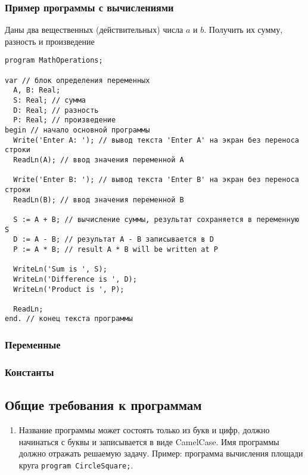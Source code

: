 \subsubsection{Пример программы с вычислениями}
Даны два вещественных (действительных) числа $a$ и $b$. Получить их сумму, разность и произведение
\begin{lstlisting}[label=some-code,caption={Текст программы MathOperations}]
program MathOperations;

var // блок определения переменных
  A, B: Real;
  S: Real; // сумма
  D: Real; // разность
  P: Real; // произведение
begin // начало основной программы
  Write('Enter A: '); // вывод текста 'Enter A' на экран без переноса строки
  ReadLn(A); // ввод значения переменной A

  Write('Enter B: '); // вывод текста 'Enter B' на экран без переноса строки
  ReadLn(B); // ввод значения переменной B

  S := A + B; // вычисление суммы, результат сохраняется в переменную S
  D := A - B; // результат A - B записывается в D
  P := A * B; // result A * B will be written at P

  WriteLn('Sum is ', S);
  WriteLn('Difference is ', D);
  WriteLn('Product is ', P);

  ReadLn;
end. // конец текста программы
\end{lstlisting}

\subsubsection{Переменные}
\subsubsection{Константы}












\subsection*{Общие требования к программам}
\begin{enumerate}
\item Название программы может состоять только из букв и цифр, должно начинаться с буквы и записывается в виде CamelCase. Имя программы должно отражать решаемую задачу.
Пример: программа вычисления площади круга \texttt{program CircleSquare;}.
\end{enumerate}


